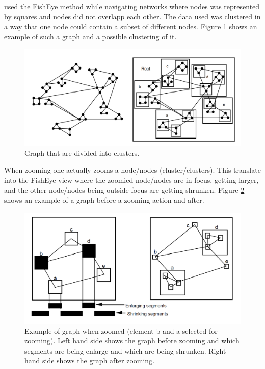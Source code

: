 \documentclass[a4paper,11pt]{kth-mag}
\begin{document}
\cite{Schaffer:1996:NHC:230562.230577} used the FishEye method while navigating networks where nodes was represented by squares and  
nodes did not overlapp each other. The data used was clustered in a way that one node could contain a subset of different nodes. Figure \ref{fig:FishEyeCluster} shows an example of such a graph and a 
possible clustering of it.

\begin{figure}[!htbp]
	\centering
	\includegraphics[scale=0.3]{FishEyeCluster}
	\caption{Graph that are divided into clusters.}
	\label{fig:FishEyeCluster}
\end{figure}

When zooming one actually zooms a node/nodes (cluster/clusters). This translate into the FishEye view where the zoomied node/nodes are in focus, getting larger, and the
other node/nodes being outside focus are getting shrunken. Figure \ref{fig:FishEyeZoom} shows an example of a graph before a zooming action and after.

\begin{figure}[!htbp]
	\centering
	\includegraphics[scale=0.3]{FishEyeZoom}
	\caption{Example of graph when zoomed (element b and a selected for zooming). Left hand side shows the graph before zooming and which segments are being enlarge and which are being shrunken. Right hand side shows the graph after zooming.}
	\label{fig:FishEyeZoom}
\end{figure}
\newpage
\end{document}
